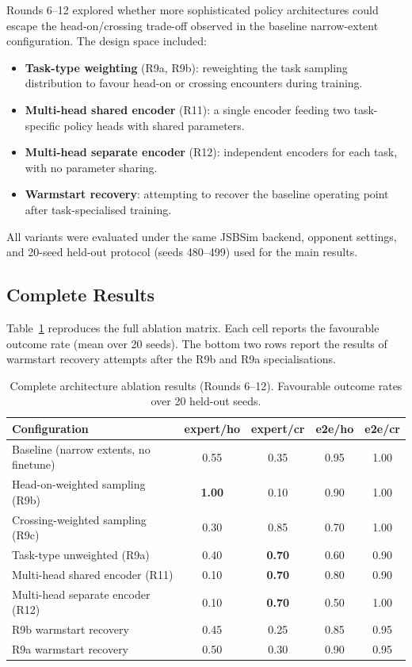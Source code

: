 \documentclass[drones,article,submit,pdftex,moreauthors]{Definitions/mdpi}
\begin{document}
Rounds 6--12 explored whether more sophisticated policy architectures could escape the head-on/crossing trade-off observed in the baseline narrow-extent configuration. The design space included:
\begin{itemize}
    \item \textbf{Task-type weighting} (R9a, R9b): reweighting the task sampling distribution to favour head-on or crossing encounters during training.
    \item \textbf{Multi-head shared encoder} (R11): a single encoder feeding two task-specific policy heads with shared parameters.
    \item \textbf{Multi-head separate encoder} (R12): independent encoders for each task, with no parameter sharing.
    \item \textbf{Warmstart recovery}: attempting to recover the baseline operating point after task-specialised training.
\end{itemize}
All variants were evaluated under the same JSBSim backend, opponent settings, and 20-seed held-out protocol (seeds 480--499) used for the main results.

\subsection{Complete Results}

Table~\ref{tab:full_ablation} reproduces the full ablation matrix. Each cell reports the favourable outcome rate (mean over 20 seeds). The bottom two rows report the results of warmstart recovery attempts after the R9b and R9a specialisations.

\begin{table}[H]
\centering
\caption{Complete architecture ablation results (Rounds 6--12). Favourable outcome rates over 20 held-out seeds.}
\label{tab:full_ablation}
\begin{tabular}{@{}lcccc@{}}
\toprule
Configuration & expert/ho & expert/cr & e2e/ho & e2e/cr \\
\midrule
Baseline (narrow extents, no finetune) & 0.55 & 0.35 & 0.95 & 1.00 \\
Head-on-weighted sampling (R9b) & \textbf{1.00} & 0.10 & 0.90 & 1.00 \\
Crossing-weighted sampling (R9c) & 0.30 & 0.85 & 0.70 & 1.00 \\
Task-type unweighted (R9a) & 0.40 & \textbf{0.70} & 0.60 & 0.90 \\
Multi-head shared encoder (R11) & 0.10 & \textbf{0.70} & 0.80 & 0.90 \\
Multi-head separate encoder (R12) & 0.10 & \textbf{0.70} & 0.50 & 1.00 \\
\midrule
R9b warmstart recovery & 0.45 & 0.25 & 0.85 & 0.95 \\
R9a warmstart recovery & 0.50 & 0.30 & 0.90 & 0.95 \\
\bottomrule
\end{tabular}
\end{table}
\end{document}
